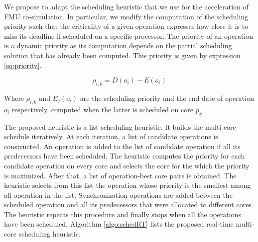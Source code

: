 We propose to adapt the scheduling heuristic that we use for the acceleration of FMU co-simulation. In particular, we modify the computation of the scheduling priority such that the criticality of a given operation expresses how close it is to miss its deadline if scheduled on a specific processor. The priority of an operation is a dynamic priority as its computation depends on the partial scheduling solution that has already been computed. This priority is given by expression \ref{eq:priority}.

\begin{equation}
\rho_{i,k} = D(o_i) - E(o_i)
\label{eq:priority}
\end{equation}

Where $\rho_{i,k}$ and $E_j(o_i)$ are the scheduling priority and the end date of operation $o_i$ respectively, computed when the latter is scheduled on core $p_k$.

The proposed heuristic is a list scheduling heuristic. It builds the multi-core schedule iteratively. At each iteration, a list of candidate operations is constructed. An operation is added to the list of candidate operation if all its predecessors have been scheduled. The heuristic computes the priority for each candidate operation on every core and selects the core for the which the priority is maximized. After that, a list of operation-best core pairs is obtained. The heuristic selects from this list the operation whose priority is the smallest among all operation in the list. Synchronization operations are added between the scheduled operation and all its predecessors that were allocated to different cores. The heuristic repeats this procedure and finally stops when all the operations have been scheduled. Algorithm \ref{algo:schedRT} lists the proposed real-time multi-core scheduling heuristic. 

